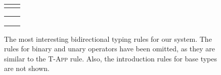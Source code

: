 \begin{center}
\begin{figure}

\begin{center}
\usebox{\ptone}
\end{center}

\paragraph{} %

\begin{tabu}{c c}
\usebox{\pttwo} & \usebox{\ptthree}
\end{tabu}

\begin{prooftree}
\end{prooftree}

\begin{prooftree}
\end{prooftree}

\begin{tabu}{c c}
\usebox{\ptPairElimOne} & \usebox{\ptPairElimTwo}
\\ \\
\usebox{\ptSumIntroOne} & \usebox{\ptSumIntroTwo}
\end{tabu}


\begin{prooftree}
\end{prooftree}

\begin{prooftree}
\end{prooftree}

\caption{The most interesting bidirectional typing rules for our system. The rules for binary and unary operators have been omitted, as they are similar to the \textsc{T-App} rule. Also, the introduction rules for base types are not shown.}
\label{fig:bidirectional-typing-rules}
\end{figure}
\end{center}


